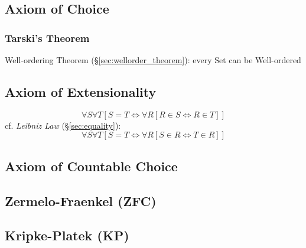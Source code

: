 \subsection{Axiom of Choice}\label{sec:choice_axiom}

\subsubsection{Tarski's Theorem}\label{sec:tarskis_theorem}

Well-ordering Theorem (\S\ref{sec:wellorder_theorem}): every Set can
be Well-ordered



\subsection{Axiom of Extensionality}\label{sec:extensionality_axiom}

\[
  \forall S \forall T
    [S = T \Leftrightarrow \forall R [ R \in S \Leftrightarrow R \in T ]]
\]
cf. \emph{Leibniz Law} (\S\ref{sec:equality}):
\[
  \forall S \forall T
    [S = T \Leftrightarrow \forall R [ S \in R \Leftrightarrow T \in R ]]
\]


\subsection{Axiom of Countable Choice}\label{sec:countable_choice}

\subsection{Zermelo-Fraenkel (ZFC)}\label{sec:zermelo_fraenkel}


\subsection{Kripke-Platek (KP)}\label{sec:kripke_platek}


